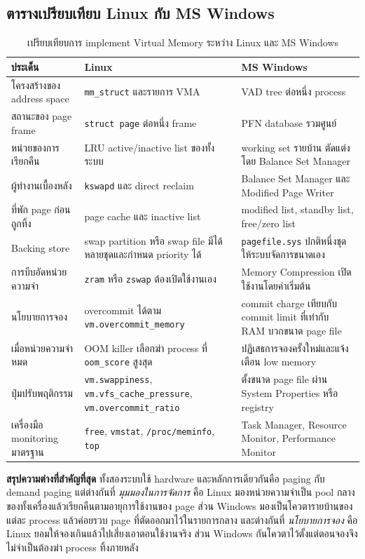 \documentclass[a4paper,11pt]{article}
\newcommand{\code}[1]{\texttt{#1}}
\begin{document}
\subsection{ตารางเปรียบเทียบ Linux กับ MS Windows}

\begin{table}[H]
\centering\small
\caption{เปรียบเทียบการ implement Virtual Memory ระหว่าง Linux และ MS Windows}
\begin{tabular}{@{}p{3.3cm}p{6.1cm}p{6.1cm}@{}}
\toprule
\textbf{ประเด็น} & \textbf{Linux} & \textbf{MS Windows} \\
\midrule
โครงสร้างของ address space & \code{mm\_struct} และรายการ VMA & VAD tree ต่อหนึ่ง process \\
สถานะของ page frame & \code{struct page} ต่อหนึ่ง frame & PFN database รวมศูนย์ \\
หน่วยของการเรียกคืน & LRU active/inactive list ของทั้งระบบ & working set รายบ้าน ตัดแต่งโดย Balance Set Manager \\
ผู้ทำงานเบื้องหลัง & \code{kswapd} และ direct reclaim & Balance Set Manager และ Modified Page Writer \\
ที่พัก page ก่อนถูกทิ้ง & page cache และ inactive list & modified list, standby list, free/zero list \\
Backing store & swap partition หรือ swap file มีได้หลายชุดและกำหนด priority ได้ & \code{pagefile.sys} ปกติหนึ่งชุด ให้ระบบจัดการขนาดเอง \\
การบีบอัดหน่วยความจำ & \code{zram} หรือ \code{zswap} ต้องเปิดใช้งานเอง & Memory Compression เปิดใช้งานโดยค่าเริ่มต้น \\
นโยบายการจอง & overcommit ได้ตาม \code{vm.overcommit\_memory} & commit charge เทียบกับ commit limit ที่เท่ากับ RAM บวกขนาด page file \\
เมื่อหน่วยความจำหมด & OOM killer เลือกฆ่า process ที่ \code{oom\_score} สูงสุด & ปฏิเสธการจองครั้งใหม่และแจ้งเตือน low memory \\
ปุ่มปรับพฤติกรรม & \code{vm.swappiness}, \code{vm.vfs\_cache\_pressure}, \code{vm.overcommit\_ratio} & ตั้งขนาด page file ผ่าน System Properties หรือ registry \\
เครื่องมือ monitoring มาตรฐาน & \code{free}, \code{vmstat}, \code{/proc/meminfo}, \code{top} & Task Manager, Resource Monitor, Performance Monitor \\
\bottomrule
\end{tabular}
\end{table}

\textbf{สรุปความต่างที่สำคัญที่สุด} ทั้งสองระบบใช้ hardware และหลักการเดียวกันคือ paging กับ demand paging แต่ต่างกันที่ \textit{มุมมองในการจัดการ} คือ Linux มองหน่วยความจำเป็น pool กลางของทั้งเครื่องแล้วเรียกคืนตามอายุการใช้งานของ page ส่วน Windows มองเป็นโควตารายบ้านของแต่ละ process แล้วค่อยรวบ page ที่ตัดออกมาไว้ในรายการกลาง และต่างกันที่ \textit{นโยบายการจอง} คือ Linux ยอมให้จองเกินแล้วไปเสี่ยงเอาตอนใช้งานจริง ส่วน Windows กันโควตาไว้ตั้งแต่ตอนจองจึงไม่จำเป็นต้องฆ่า process ทิ้งภายหลัง
\end{document}
